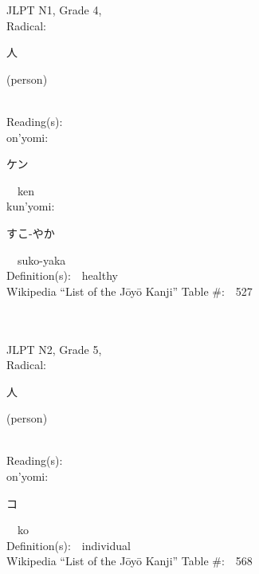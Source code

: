 \begin{multicols}{2}
{JLPT N1, Grade 4, \\Radical:\ \ {\begin{CJK}{UTF8}{min} 人 \end{CJK}} (person) } \\
Reading(s):\ \ \\
{\hspace*{1em}}on'yomi:\ \ \\
{\hspace*{2em}}{\begin{CJK}{UTF8}{min} ケン \end{CJK}}\ \ ken\ \ \\
{\hspace*{1em}}kun'yomi:\ \ \\
{\hspace*{2em}}{\begin{CJK}{UTF8}{min} すこ-やか \end{CJK}}\ \ suko-yaka\ \ \\
Definition(s):\ \ healthy \\
Wikipedia ``List of the J\=oy\=o Kanji'' Table \#:\ \ 527 \\
\ \ \\
{\fontsize{34pt}{40pt}  }\ \ \\  %
{JLPT N2, Grade 5, \\Radical:\ \ {\begin{CJK}{UTF8}{min} 人 \end{CJK}} (person) } \\
Reading(s):\ \ \\
{\hspace*{1em}}on'yomi:\ \ \\
{\hspace*{2em}}{\begin{CJK}{UTF8}{min} コ \end{CJK}}\ \ ko\ \ \\
Definition(s):\ \ individual \\
Wikipedia ``List of the J\=oy\=o Kanji'' Table \#:\ \ 568 \\
\ \ \\
{\fontsize{34pt}{40pt}  }\ \ \\  %

\end{multicols}
